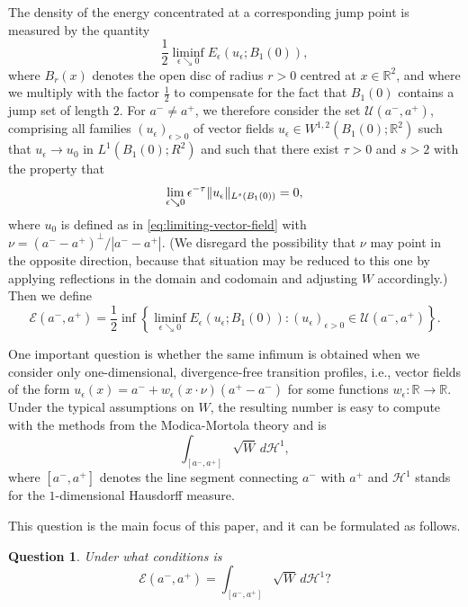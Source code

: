 \documentclass[a4paper]{article}
\newcommand{\R}{\mathbb{R}}
\newcommand{\Ha}{\mathcal{H}}
\let\div\relax\DeclareMathOperator{\div}{div}
\newcommand{\set}[2]{\left\{ #1 \colon #2 \right\}}
\newtheorem{question}[theorem]{Question}
\theoremstyle{definition}
\theoremstyle{remark}
\begin{document}
The density of the energy concentrated at a corresponding jump point is measured by the
quantity
\[
\frac{1}{2} \liminf_{\epsilon \searrow 0} E_\epsilon(u_\epsilon; B_1(0)),
\]
where $B_r(x)$ denotes the open disc of radius $r > 0$ centred at $x \in \R^2$,
and where we multiply with the factor $\frac{1}{2}$ to compensate for the fact that $B_1(0)$ contains a jump set of length $2$.
For $a^- \neq a^+$, we therefore consider the set
$\mathcal{U}(a^-, a^+)$, comprising all families $(u_\epsilon)_{\epsilon > 0}$ of vector fields $u_\epsilon \in W^{1, 2}(B_1(0); \R^2)$ such that
$u_\epsilon \to u_0$ in $L^1(B_1(0); R^2)$ and such that there exist
$\tau > 0$ and $s > 2$ with the property that
\begin{equation} \label{eq:small-divergence}
\lim_{\epsilon \searrow 0} \epsilon^{-\tau} \|\div u_\epsilon\|_{L^s(B_1(0))} = 0,
\end{equation}
where $u_0$ is defined as in \eqref{eq:limiting-vector-field} with $\nu = (a^- - a^+)^\perp/|a^- - a^+|$.
(We disregard the possibility that $\nu$ may point in the opposite direction, because that situation may
be reduced to this one by applying reflections in the domain and codomain and adjusting $W$ accordingly.)
Then we define
\[
\mathcal{E}(a^-, a^+) = \frac{1}{2} \inf\set{\liminf_{\epsilon \searrow 0} E_\epsilon(u_\epsilon; B_1(0))}{(u_\epsilon)_{\epsilon > 0} \in  \mathcal{U}(a^-, a^+)}.
\]

One important question is whether the same infimum is obtained when we
consider only one-dimensional, divergence-free transition profiles, i.e.,
vector fields of the form $u_\epsilon(x) = a^- + w_\epsilon(x \cdot \nu) (a^+ - a^-)$
for some functions $w_\epsilon \colon \R \to \R$. Under the typical
assumptions on $W$, the resulting number is easy to compute with the methods
from the Modica-Mortola theory and is
\[
\int_{[a^-, a^+]} \sqrt{W} \, d\Ha^1,
\]
where $[a^-, a^+]$ denotes the line segment connecting $a^-$ with $a^+$ and
$\Ha^1$ stands for the $1$-dimensional Hausdorff measure.

This question is the main focus of this paper, and it can be formulated as follows.

\begin{question} \label{qst:1D}
Under what conditions is
\[
\mathcal{E}(a^-, a^+) = \int_{[a^-, a^+]} \sqrt{W} \, d\Ha^1?
\]
\end{question}
\end{document}

